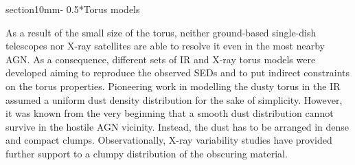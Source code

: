 \documentclass{natureprintstyle}
\makeatletter
\renewcommand{\section}{\@startsection%
{section}{1}{0mm}{-\baselineskip}%
{0.5\baselineskip}{\normalfont\Large\bfseries}}%
\makeatother
\begin{document}



\section*{Torus models}

{As a result of the small size of the torus, neither ground-based single-dish telescopes nor X-ray satellites are able to resolve it even in the most nearby AGN.}
As a consequence, different sets of IR and X-ray torus models were developed aiming to reproduce the observed SEDs and to put indirect constraints on the torus properties. Pioneering work in modelling the dusty torus\cite{Pier92,Pier93} in the IR assumed a uniform dust density distribution for the sake of simplicity. However, it was known from the very beginning that a smooth dust distribution cannot survive in the hostile AGN vicinity\cite{Krolik88}. Instead, the dust has to be arranged in dense and compact clumps. Observationally, X-ray variability studies have provided further support to a clumpy distribution of the obscuring material\cite{Markowitz:2014oq,Marinucci:2016eu}.

\end{document}
